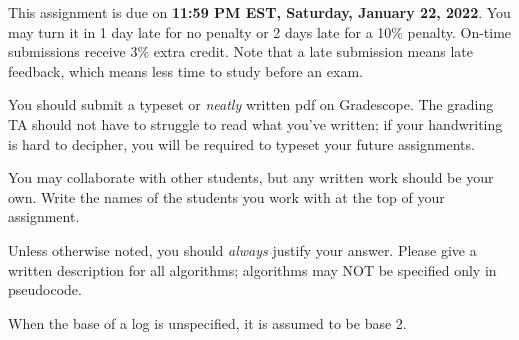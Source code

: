 \documentclass[11pt]{article}
\begin{document}

This assignment is due on \textbf{11:59 PM EST, Saturday, January 22, 2022}. You may turn it in 1 day late for no penalty or 2 days late for a 10\% penalty. On-time submissions receive 3\% extra credit.  Note that a late submission means late feedback, which means less time to study before an exam.

You should submit a typeset or \emph{neatly} written pdf on Gradescope.  The grading TA should not have to struggle to read what you've written; if your handwriting is hard to decipher, you will be required to typeset your future assignments.

You may collaborate with other students, but any written work should be your own. Write the names of the students you work with at the top of your assignment.

 Unless otherwise noted, you should \textit{always} justify your answer. Please give a written description for all algorithms; algorithms may NOT be specified only in pseudocode.
 
 When the base of a log is unspecified, it is assumed to be base 2.
\end{document}
